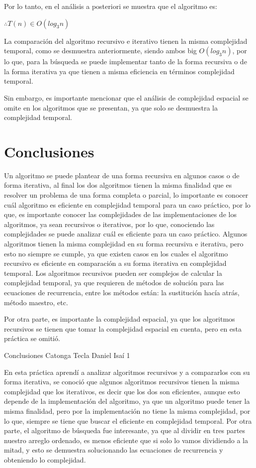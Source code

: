 \documentclass[12pt,twoside]{article}
\begin{document}
Por lo tanto, en el análisis a posteriori se muestra que el algoritmo es:
\begin{center}
  $\therefore T(n)\in O(log_3n)$
\end{center}

La comparación del algoritmo recursivo e iterativo tienen la misma complejidad temporal, como se desmuestra anteriormente, siendo ambos
big $O(log_3n)$, por lo que, para la búsqueda se puede implementar tanto de la forma recursiva o de la forma iterativa ya que tienen a misma eficiencia
en términos complejidad temporal. 

Sin embargo, es importante mencionar que el análisis de complejidad espacial se omite en los algoritmos que se presentan, ya que solo se desmuestra la complejidad temporal.

\newpage
\section{Conclusiones}

Un algoritmo se puede plantear de una forma recursiva en algunos casos o de forma iterativa, al final los dos algoritmos tienen la misma finalidad que es resolver un problema de una forma completa o parcial, lo importante es conocer cuál algoritmo es eficiente en complejidad temporal para un caso práctico, por lo que, es importante conocer las complejidades de las implementaciones de los algoritmos, ya sean recursivos o iterativos, por lo que, conociendo las complejidades se puede analizar cuál es eficiente para un caso práctico. Algunos algoritmos tienen la misma complejidad en su forma recursiva e iterativa, pero esto no siempre se cumple, ya que existen casos en los cuales el algoritmo recursivo es eficiente en comparación a su forma iterativa en complejidad temporal. Los algoritmos recursivos pueden ser complejos de calcular la complejidad temporal, ya que requieren de métodos de solución para las ecuaciones de recurrencia, entre los métodos están: la sustitución hacía atrás, método maestro, etc.

Por otra parte, es importante la complejidad espacial, ya que los algoritmos recursivos se tienen que tomar la complejidad espacial en cuenta, pero en esta práctica se omitió. 

\medskip

Conclusiones Catonga Tecla Daniel Isaí 1
\par
En esta práctica aprendí a analizar algoritmos recursivos y a compararlos con su forma iterativa, se conoció que algunos algoritmos recursivos tienen la misma complejidad que los iterativos, es decir que los dos son eficientes, aunque esto depende de la implementación del algoritmo, ya que un algoritmo puede tener la misma finalidad, pero por la implementación no tiene la misma complejidad, por lo que, siempre se tiene que buscar el eficiente en complejidad temporal. Por otra parte, el algoritmo de búsqueda fue interesante, ya que al dividir en tres partes nuestro arreglo ordenado, es menos eficiente que si solo lo vamos dividiendo a la mitad, y esto se demuestra solucionando las ecuaciones de recurrencia y obteniendo lo complejidad.
\end{document}
